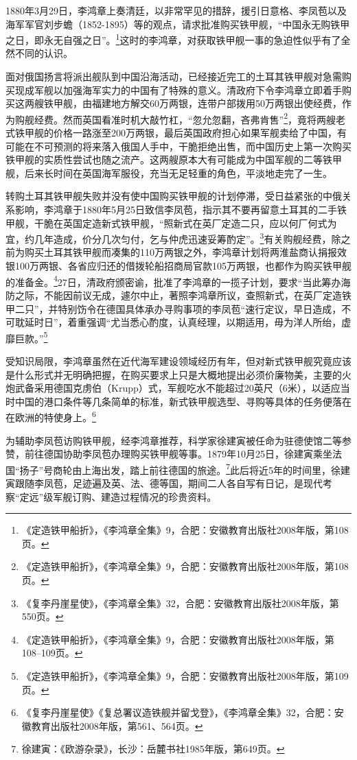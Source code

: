 \documentclass[12pt,UTF8]{ctexbook}
\begin{document}
1880年3月29日，李鸿章上奏清廷，以非常罕见的措辞，援引日意格、李凤苞以及海军军官刘步蟾（1852-1895）等的观点，请求批准购买铁甲舰，“中国永无购铁甲之日，即永无自强之日”。\footnote{《定造铁甲船折》，《李鸿章全集》9，合肥：安徽教育出版社2008年版，第108页。}这时的李鸿章，对获取铁甲舰一事的急迫性似乎有了全然不同的认识。

面对俄国扬言将派出舰队到中国沿海活动，已经接近完工的土耳其铁甲舰对急需购买现成军舰以加强海军实力的中国有了特殊的意义。清政府下令李鸿章立即着手购买这两艘铁甲舰，由福建地方解交60万两银，连带户部拨用50万两银出使经费，作为购舰经费。然而英国看准时机大敲竹杠，“忽允忽翻，吝弗肯售”\footnote{《定造铁甲船折》，《李鸿章全集》9，合肥：安徽教育出版社2008年版，第108页。}，竟将两艘老式铁甲舰的价格一路涨至200万两银，最后英国政府担心如果军舰卖给了中国，有可能在不可预测的将来落入俄国人手中，干脆拒绝出售，而中国历史上第一次购买铁甲舰的实质性尝试也随之流产。这两艘原本大有可能成为中国军舰的二等铁甲舰，后来长时间在英国海军服役，充当无足轻重的角色，平淡地走完了一生。

转购土耳其铁甲舰失败并没有使中国购买铁甲舰的计划停滞，受日益紧张的中俄关系影响，李鸿章于1880年5月25日致信李凤苞，指示其不要再留意土耳其的二手铁甲舰，干脆在英国定造新式铁甲舰，“照新式在英厂定造二只，应以何厂何式为宜，约几年造成，价分几次匀付，乞与仲虎迅速妥筹酌定”。\footnote{《复李丹崖星使》，《李鸿章全集》32，合肥：安徽教育出版社2008年版，第550页。}有关购舰经费，除之前为购买土耳其铁甲舰而凑集的110万两银之外，李鸿章计划将两淮盐商认捐报效银100万两银、各省应归还的借拨轮船招商局官款105万两银，也都作为购买铁甲舰的准备金。\footnote{《定造铁甲船折》，《李鸿章全集》9，合肥：安徽教育出版社2008年版，第108--109页。}27日，清政府颁密谕，批准了李鸿章的一揽子计划，要求“当此筹办海防之际，不能因前议无成，遽尔中止，著照李鸿章所议，查照新式，在英厂定造铁甲二只”，并特别饬令在德国具体承办寻购事项的李凤苞“速行定议，早日造成，不可耽延时日”，着重强调“尤当悉心酌度，认真经理，以期适用，毋为洋人所绐，虚靡巨款。”\footnote{《定造铁甲船折》，《李鸿章全集》9，合肥：安徽教育出版社2008年版，第109页。}

受知识局限，李鸿章虽然在近代海军建设领域经历有年，但对新式铁甲舰究竟应该是什么形式并无明确把握，在购买要求上只是大概地提出必须价廉物美，主要的火炮武备采用德国克虏伯（Krupp）式，军舰吃水不能超过20英尺（6米），以适应当时中国的港口条件等几条简单的标准，新式铁甲舰选型、寻购等具体的任务便落在在欧洲的特使身上。\footnote{《复李丹崖星使》《复总署议造铁舰并留戈登》，《李鸿章全集》32，合肥：安徽教育出版社2008年版，第561、564页。}

为辅助李凤苞访购铁甲舰，经李鸿章推荐，科学家徐建寅被任命为驻德使馆二等参赞，前往德国协助李凤苞办理购买铁甲舰等事。1879年10月25日，徐建寅乘坐法国“扬子”号商轮由上海出发，踏上前往德国的旅途。\footnote{徐建寅：《欧游杂录》，长沙：岳麓书社1985年版，第649页。}此后将近5年的时间里，徐建寅跟随李凤苞，足迹遍及英、法、德等国，期间二人各自写有日记，是现代考察“定远”级军舰订购、建造过程情况的珍贵资料。
\end{document}
